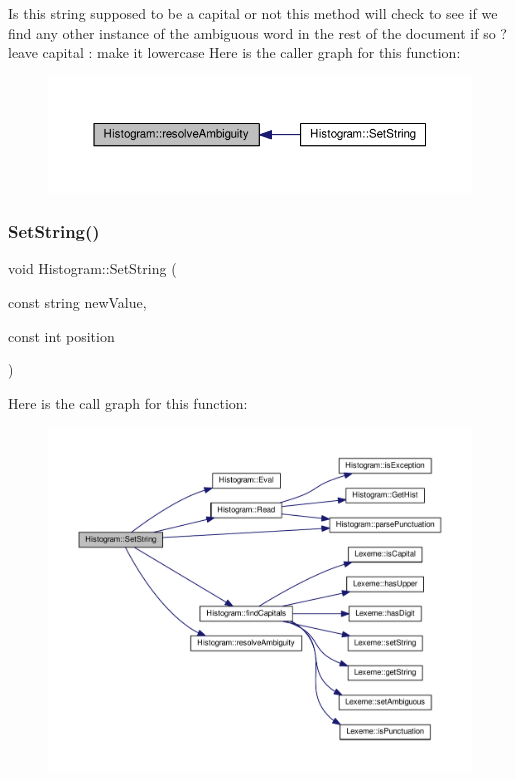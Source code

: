 Is this string supposed to be a capital or not this method will check to see if we find any other instance of the ambiguous word in the rest of the document if so ? leave capital \+: make it lowercase Here is the caller graph for this function\+:
\nopagebreak
\begin{figure}[H]
\begin{center}
\leavevmode
\includegraphics[width=350pt]{class_histogram_a5adb0e9b69168b662af9f84cbf29d5a0_icgraph}
\end{center}
\end{figure}
\mbox{\label{class_histogram_a3b48f22da2e0c9f1d12ecd7a83f0dcf6}} 
\subsubsection{\texorpdfstring{Set\+String()}{SetString()}}
{\footnotesize\ttfamily void Histogram\+::\+Set\+String (\begin{DoxyParamCaption}\item[{const string}]{new\+Value,  }\item[{const int}]{position }\end{DoxyParamCaption})\hspace{0.3cm}{\ttfamily [inline]}}

Here is the call graph for this function\+:
\nopagebreak
\begin{figure}[H]
\begin{center}
\leavevmode
\includegraphics[width=350pt]{class_histogram_a3b48f22da2e0c9f1d12ecd7a83f0dcf6_cgraph}
\end{center}
\end{figure}
\mbox{\label{class_histogram_af8b644d9dcb8dd86fb3420640de72ab2}} 
